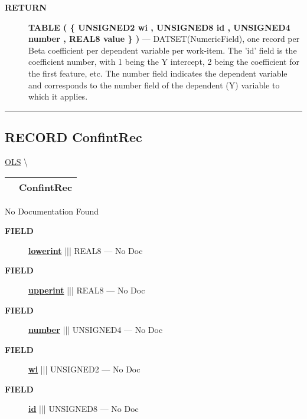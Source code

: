 \par
\begin{description}
\item [\colorbox{tagtype}{\color{white} \textbf{\textsf{RETURN}}}] \textbf{TABLE ( \{ UNSIGNED2 wi , UNSIGNED8 id , UNSIGNED4 number , REAL8 value \} )} --- DATSET(NumericField), one record per Beta coefficient per dependent variable per work-item. The 'id' field is the coefficient number, with 1 being the Y intercept, 2 being the coefficient for the first feature, etc. The number field indicates the dependent variable and corresponds to the number field of the dependent (Y) variable to which it applies.
\end{description}




\rule{\linewidth}{0.5pt}
\subsection*{\textsf{\colorbox{headtoc}{\color{white} RECORD}
ConfintRec}}

\hypertarget{ecldoc:linearregression.ols.confintrec}{}
\hspace{0pt} \hyperlink{ecldoc:linearregression.ols}{OLS} \textbackslash 

{\renewcommand{\arraystretch}{1.5}
\begin{tabularx}{\textwidth}{|>{\raggedright\arraybackslash}l|X|}
\hline
\hspace{0pt}\mytexttt{\color{red} } & \textbf{ConfintRec} \\
\hline
\end{tabularx}
}

\par





No Documentation Found







\par
\begin{description}
\item [\colorbox{tagtype}{\color{white} \textbf{\textsf{FIELD}}}] \textbf{\underline{lowerint}} ||| REAL8 --- No Doc
\item [\colorbox{tagtype}{\color{white} \textbf{\textsf{FIELD}}}] \textbf{\underline{upperint}} ||| REAL8 --- No Doc
\item [\colorbox{tagtype}{\color{white} \textbf{\textsf{FIELD}}}] \textbf{\underline{number}} ||| UNSIGNED4 --- No Doc
\item [\colorbox{tagtype}{\color{white} \textbf{\textsf{FIELD}}}] \textbf{\underline{wi}} ||| UNSIGNED2 --- No Doc
\item [\colorbox{tagtype}{\color{white} \textbf{\textsf{FIELD}}}] \textbf{\underline{id}} ||| UNSIGNED8 --- No Doc
\end{description}





